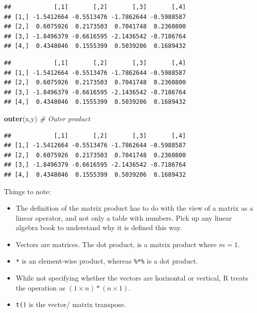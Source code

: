 \documentclass[]{book}
\newenvironment{Shaded}{\begin{snugshade}}{\end{snugshade}}
\newcommand{\CommentTok}[1]{\textcolor[rgb]{0.56,0.35,0.01}{\textit{#1}}}
\newcommand{\KeywordTok}[1]{\textcolor[rgb]{0.13,0.29,0.53}{\textbf{#1}}}
\newcommand{\NormalTok}[1]{#1}
\newcommand{\OperatorTok}[1]{\textcolor[rgb]{0.81,0.36,0.00}{\textbf{#1}}}
\newcommand{\StringTok}[1]{\textcolor[rgb]{0.31,0.60,0.02}{#1}}
\providecommand{\tightlist}{%
  \setlength{\itemsep}{0pt}\setlength{\parskip}{0pt}}
\theoremstyle{definition}
\theoremstyle{definition}
\theoremstyle{definition}
\theoremstyle{remark}
\begin{document}
\begin{Shaded}
\end{Shaded}

\begin{verbatim}
##            [,1]       [,2]       [,3]       [,4]
## [1,] -1.5412664 -0.5513476 -1.7862644 -0.5988587
## [2,]  0.6075926  0.2173503  0.7041748  0.2360800
## [3,] -1.8496379 -0.6616595 -2.1436542 -0.7186764
## [4,]  0.4348046  0.1555399  0.5039206  0.1689432
\end{verbatim}

\begin{Shaded}
\end{Shaded}

\begin{verbatim}
##            [,1]       [,2]       [,3]       [,4]
## [1,] -1.5412664 -0.5513476 -1.7862644 -0.5988587
## [2,]  0.6075926  0.2173503  0.7041748  0.2360800
## [3,] -1.8496379 -0.6616595 -2.1436542 -0.7186764
## [4,]  0.4348046  0.1555399  0.5039206  0.1689432
\end{verbatim}

\begin{Shaded}
\begin{Highlighting}[]
\KeywordTok{outer}\NormalTok{(x,y) }\CommentTok{# Outer product}
\end{Highlighting}
\end{Shaded}

\begin{verbatim}
##            [,1]       [,2]       [,3]       [,4]
## [1,] -1.5412664 -0.5513476 -1.7862644 -0.5988587
## [2,]  0.6075926  0.2173503  0.7041748  0.2360800
## [3,] -1.8496379 -0.6616595 -2.1436542 -0.7186764
## [4,]  0.4348046  0.1555399  0.5039206  0.1689432
\end{verbatim}

Things to note:

\begin{itemize}
\tightlist
\item
  The definition of the matrix product has to do with the view of a matrix as a linear operator, and not only a table with numbers. Pick up any linear algebra book to understand why it is defined this way.
\item
  Vectors are matrices. The dot product, is a matrix product where \(m=1\).
\item
  \texttt{*} is an element-wise product, whereas \texttt{\%*\%} is a dot product.
\item
  While not specifying whether the vectors are horizontal or vertical, R treats the operation as \((1 \times n) * (n \times 1)\).
\item
  \texttt{t()} is the vector/ matrix transpose.
\end{itemize}
\end{document}

